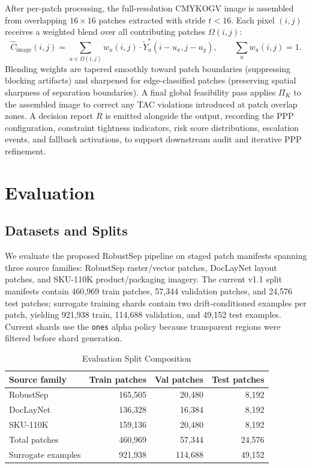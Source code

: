 \documentclass[acmsmall,screen,nonacm]{acmart}
\begin{document}
After per-patch processing, the full-resolution CMYKOGV image is assembled from overlapping $16\times 16$ patches extracted with stride $t < 16$. Each pixel $(i,j)$ receives a weighted blend over all contributing patches $\Omega(i,j)$:
\[
\hat{C}_{\text{image}}(i,j)
=
\sum_{u \in \Omega(i,j)}
w_u(i,j)\cdot \tilde{Y}_u^*(i-u_x, j-u_y),
\qquad
\sum_u w_u(i,j) = 1.
\]
Blending weights are tapered smoothly toward patch boundaries (suppressing blocking artifacts) and sharpened for edge-classified patches (preserving spatial sharpness of separation boundaries). A final global feasibility pass applies $\Pi_K$ to the assembled image to correct any TAC violations introduced at patch overlap zones. A decision report $R$ is emitted alongside the output, recording the PPP configuration, constraint tightness indicators, risk score distributions, escalation events, and fallback activations, to support downstream audit and iterative PPP refinement.

\section{Evaluation}

\subsection{Datasets and Splits}

\begin{sloppypar}
We evaluate the proposed RobustSep pipeline on staged patch manifests spanning three source families: RobustSep raster/vector patches, DocLayNet layout patches, and SKU-110K product/packaging imagery. The current v1.1 split manifests contain 460,969 train patches, 57,344 validation patches, and 24,576 test patches; surrogate training shards contain two drift-conditioned examples per patch, yielding 921,938 train, 114,688 validation, and 49,152 test examples. Current shards use the \texttt{ones} alpha policy because transparent regions were filtered before shard generation.
\end{sloppypar}

\begin{table}[htbp]
\centering
\caption{Evaluation Split Composition}
\label{tab:dataset_splits}
\begin{tabular}{lrrr}
\toprule
Source family & Train patches & Val patches & Test patches \\
\midrule
RobustSep & 165,505 & 20,480 & 8,192 \\
DocLayNet & 136,328 & 16,384 & 8,192 \\
SKU-110K & 159,136 & 20,480 & 8,192 \\
\midrule
Total patches & 460,969 & 57,344 & 24,576 \\
Surrogate examples & 921,938 & 114,688 & 49,152 \\
\bottomrule
\end{tabular}
\end{table}
\end{document}
